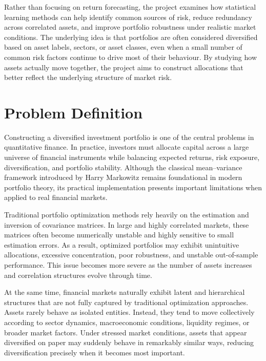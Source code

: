 \documentclass[
  12pt,
  letterpaper,
]{book}
\begin{document}
Rather than focusing on return forecasting, the project examines how
statistical learning methods can help identify common sources of risk,
reduce redundancy across correlated assets, and improve portfolio
robustness under realistic market conditions. The underlying idea is
that portfolios are often considered diversified based on asset labels,
sectors, or asset classes, even when a small number of common risk
factors continue to drive most of their behaviour. By studying how
assets actually move together, the project aims to construct allocations
that better reflect the underlying structure of market risk.

\section{Problem Definition}\label{problem-definition-1}

Constructing a diversified investment portfolio is one of the central
problems in quantitative finance. In practice, investors must allocate
capital across a large universe of financial instruments while balancing
expected returns, risk exposure, diversification, and portfolio
stability. Although the classical mean--variance framework introduced by
Harry Markowitz remains foundational in modern portfolio theory, its
practical implementation presents important limitations when applied to
real financial markets.

Traditional portfolio optimization methods rely heavily on the
estimation and inversion of covariance matrices. In large and highly
correlated markets, these matrices often become numerically unstable and
highly sensitive to small estimation errors. As a result, optimized
portfolios may exhibit unintuitive allocations, excessive concentration,
poor robustness, and unstable out-of-sample performance. This issue
becomes more severe as the number of assets increases and correlation
structures evolve through time.

At the same time, financial markets naturally exhibit latent and
hierarchical structures that are not fully captured by traditional
optimization approaches. Assets rarely behave as isolated entities.
Instead, they tend to move collectively according to sector dynamics,
macroeconomic conditions, liquidity regimes, or broader market factors.
Under stressed market conditions, assets that appear diversified on
paper may suddenly behave in remarkably similar ways, reducing
diversification precisely when it becomes most important.
\end{document}
